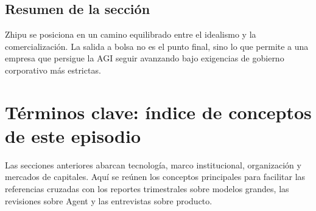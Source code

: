 \documentclass[a4paper]{article}
\begin{document}
\subsection{Resumen de la sección}

Zhipu se posiciona en un camino equilibrado entre el idealismo y la comercialización. La salida a bolsa no es el punto final, sino lo que permite a una empresa que persigue la AGI seguir avanzando bajo exigencias de gobierno corporativo más estrictas.
\section{Términos clave: índice de conceptos de este episodio}

Las secciones anteriores abarcan tecnología, marco institucional, organización y mercados de capitales. Aquí se reúnen los conceptos principales para facilitar las referencias cruzadas con los reportes trimestrales sobre modelos grandes, las revisiones sobre Agent y las entrevistas sobre producto.
\end{document}
